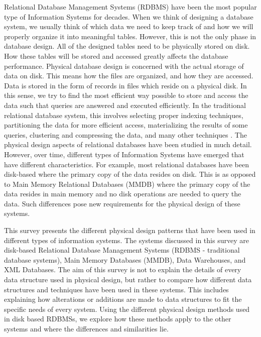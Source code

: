 \documentclass[12pt,a4paper]{article}
\begin{document}
Relational Database Management Systems (RDBMS) have been the most popular type of Information Systems for decades. When we think of designing a database system,
we usually think of which data we need to keep track of and how we will properly organize it into meaningful tables. However, this is not the only phase in
database design. All of the designed tables need to be physically stored on disk. How these tables will be stored and accessed greatly affects the database
performance. Physical database design is concerned with the actual storage of data on disk. This means how the files are organized, and how they are accessed.
Data is stored in the form of records in files which reside on a physical disk. In this sense, we try to find the most efficient way possible to store and
access the data such that queries are answered and executed efficiently. In the traditional relational database system, this involves selecting proper indexing
techniques, partitioning the data for more efficient access, materializing the results of some queries, clustering and compressing the data, and many other
techniques \cite{finkelstein1988physical,lightstone2007physical}. The physical design aspects of relational databases have been studied in much detail. However,
over time, different types of Information Systems have emerged that have different characteristics. For example, most relational databases have been disk-based
where the primary copy of the data resides on disk. This is as opposed to Main Memory Relational Databases (MMDB) where the primary copy of the data resides in
main memory and no disk operations are needed to query the data. Such differences pose new requirements for the physical design of these systems.

This survey presents the different physical design patterns that have been used in different types of information systems. The systems discussed in this survey
are disk-based Relational Database Management Systems (RDBMS - traditional database systems), Main Memory Databases (MMDB), Data Warehouses, and XML
Databases. The aim of this survey
is not to explain the details of every data structure used in physical design, but rather to compare how different data structures and techniques have been
used in these
systems. This includes explaining how alterations or additions are made to data structures to fit the specific needs of every system. Using the different
physical design methods used in disk based RDBMSs, we explore how these methods apply to the other systems and where the differences and similarities lie.
\end{document}
